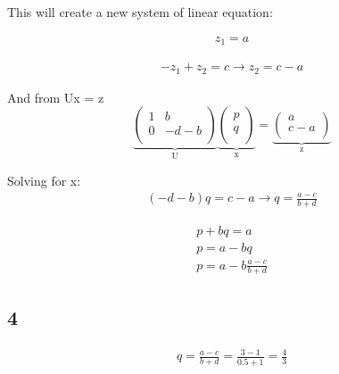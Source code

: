 \documentclass{article}
\begin{document}
This will create a new system of linear equation:

\begin{equation}
\nonumber
\begin{aligned}
z_1 = a
\end{aligned}
\end{equation}

\begin{equation}
\nonumber
\begin{aligned}
-z_1 + z_2 = c \rightarrow z_2 = c - a
\end{aligned}
\end{equation}

And from Ux = z
$$
\underbrace{\begin{pmatrix}
1&b\\
0&-d - b\\
\end{pmatrix}}_\text{U}
\underbrace{\begin{pmatrix}
p\\
q\\
\end{pmatrix}}_\text{x}
=
\underbrace{\begin{pmatrix}
a\\
c - a\\
\end{pmatrix}}_\text{z}
$$

Solving for x: 
\begin{equation}
\nonumber
\begin{aligned}
(-d - b)q = c - a \rightarrow q = \frac{a - c}{b + d} 
\end{aligned}
\end{equation}

\begin{equation}
\nonumber
\begin{aligned}
p + bq = a\\
p = a - bq\\
p = a - b \frac{a - c}{b + d}
\end{aligned}
\end{equation}

\subsection*{4}
\begin{equation}
\nonumber
\begin{aligned}
q = \frac{a - c}{b + d} = \frac{3 - 1}{0.5 + 1}= \frac{4}{3}
\end{aligned}
\end{equation}
\end{document}
